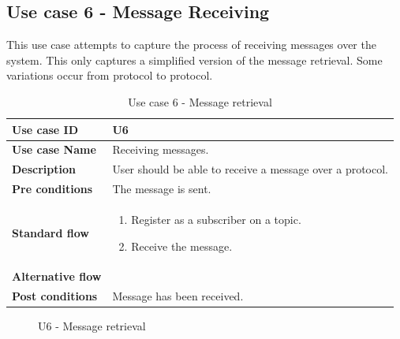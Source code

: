 \subsection{Use case 6 - Message Receiving}

This use case attempts to capture the process of receiving messages over the system. This only captures a simplified version of the message retrieval. Some variations occur from protocol to protocol.

\begin{table}[ht!]
\centering
\begin{tabular}{|l|p{5cm}|}
\hline
\textbf{Use case ID} & U6 \\ \hline
\textbf{Use case Name} & Receiving messages. \\ \hline
\textbf{Description} & User should be able to receive a message over a protocol.  \\ \hline
\textbf{Pre conditions} & The message is sent. \\ \hline
\textbf{Standard flow} & \begin{enumerate}
\item Register as a subscriber on a topic.
\item Receive the message.
\end{enumerate} \\ \hline
\textbf{Alternative flow} & \\ \hline
\textbf{Post conditions} & Message has been received.  \\ \hline
\end{tabular}
\caption{Use case 6 - Message retrieval}
\label{uc6}
\end{table}

\begin{center}
  \begin{figure}[ht!]
    \caption{U6 - Message retrieval}
    \label{fig:u6}
  \end{figure}
\end{center}

\clearpage
